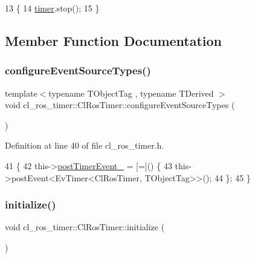 \begin{DoxyCode}
13 \{
14     \hyperlink{classcl__ros__timer_1_1ClRosTimer_a50237ecbf49b178b9d109b25ba768f5a}{timer}.stop();
15 \}
\end{DoxyCode}


\subsection{Member Function Documentation}
\mbox{\label{classcl__ros__timer_1_1ClRosTimer_a6d62a8425ed60035269ded2b5cb7590d}} 
\subsubsection{\texorpdfstring{configure\+Event\+Source\+Types()}{configureEventSourceTypes()}}
{\footnotesize\ttfamily template$<$typename T\+Object\+Tag , typename T\+Derived $>$ \\
void cl\+\_\+ros\+\_\+timer\+::\+Cl\+Ros\+Timer\+::configure\+Event\+Source\+Types (\begin{DoxyParamCaption}{ }\end{DoxyParamCaption})\hspace{0.3cm}{\ttfamily [inline]}}



Definition at line 40 of file cl\+\_\+ros\+\_\+timer.\+h.


\begin{DoxyCode}
41     \{
42         this->\hyperlink{classcl__ros__timer_1_1ClRosTimer_af502ca54355f50d19d4aa6ca5f4e0c23}{postTimerEvent\_} = [=]() \{
43             this->postEvent<EvTimer<ClRosTimer, TObjectTag>>();
44         \};
45     \}
\end{DoxyCode}
\mbox{\label{classcl__ros__timer_1_1ClRosTimer_a874e97a9e3e974966ac4999e0a293e73}} 
\subsubsection{\texorpdfstring{initialize()}{initialize()}}
{\footnotesize\ttfamily void cl\+\_\+ros\+\_\+timer\+::\+Cl\+Ros\+Timer\+::initialize (\begin{DoxyParamCaption}{ }\end{DoxyParamCaption})\hspace{0.3cm}{\ttfamily [virtual]}}



